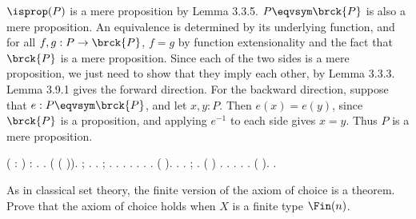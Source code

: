  \soln
$\isprop(P)$ is a mere proposition by Lemma 3.3.5.  $P \eqvsym \brck{P}$ is
also a mere proposition.  An equivalence is determined by its underlying
function, and for all $f, g : P \to \brck{P}$, $f = g$ by function
extensionality and the fact that $\brck{P}$ is a mere proposition.  Since each
of the two sides is a mere proposition, we just need to show that they imply
each other, by Lemma 3.3.3.  Lemma 3.9.1 gives the forward direction.  For the
backward direction, suppose that $e : P \eqvsym \brck{P}$, and let $x, y : P$.
Then $e(x) = e(y)$, since $\brck{P}$ is a proposition, and applying $e^{-1}$ to
each side gives $x = y$.  Thus $P$ is a mere proposition.
\begin{coqdoccode}
\coqdocemptyline
\coqdocnoindent
{}  ( : ) :   \coqdocnotation{\ensuremath{\eqvsym}} \coqdocnotation{(} \coqdocnotation{\ensuremath{\eqvsym}}  \coqdocnotation{)}.\coqdoceol
\coqdocnoindent
{}.\coqdoceol
\coqdocindent{1.00em}
 ( ( \coqdocnotation{\ensuremath{\eqvsym}}  )).  ;   .\coqdoceol
\coqdocindent{1.00em}
 .  ;  .\coqdoceol
\coqdocindent{1.00em}
 .  .\coqdoceol
\coqdocindent{1.00em}
 .\coqdoceol
\coqdocemptyline
\coqdocindent{1.00em}
 .  .  .\coqdoceol
\coqdocindent{1.00em}
 ( ).  .\coqdoceol
\coqdocemptyline
\coqdocindent{1.00em}
 .  ;   .\coqdoceol
\coqdocindent{1.00em}
 (  \coqdocnotation{=}  )  .  .  .\coqdoceol
\coqdocindent{1.00em}
 \coqdocnotation{(}  \coqdocnotation{)\^{}}.  \coqdocnotation{(}  \coqdocnotation{)\^{}}.\coqdoceol
\coqdocindent{1.00em}
 (  ).\coqdoceol
\coqdocnoindent
{}.\coqdoceol
\coqdocemptyline
\end{coqdoccode}
As in classical set theory, the finite version of the axiom of choice is a
theorem.  Prove that the axiom of choice holds when $X$ is a finite type
$\Fin(n)$.
\begin{coqdoccode}
\coqdocemptyline
\end{coqdoccode}
